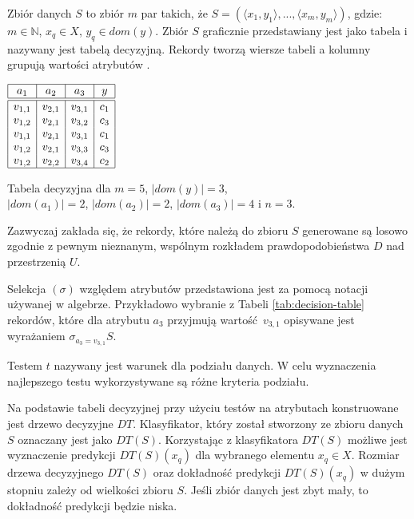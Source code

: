 \documentclass[12pt]{article}
\begin{document}
Zbiór danych $S$ to zbiór $m$ par takich, że $S = (\langle x_1, y_1\rangle, ..., \langle x_m, y_m\rangle)$,
gdzie: $m \in \mathbb{N} $, $x_q \in X$, $y_q \in dom(y)$. Zbiór $S$ graficznie przedstawiany jest jako tabela
i nazywany jest tabelą decyzyjną. Rekordy tworzą wiersze tabeli a kolumny grupują wartości atrybutów \cite{data-mining-with-decision-trees}.

\begin{table}[H]
    \centering
    $\begin{array}{|c|c|c|c|}
        \hline 
        a_1 & a_2 & a_3 & y \\
        \hline \hline
        v_{1,1} & v_{2,1} & v_{3,1} & c_1 \\
        v_{1,2} & v_{2,1} & v_{3,2} & c_3 \\
        v_{1,1} & v_{2,1} & v_{3,1} & c_1 \\
        v_{1,2} & v_{2,1} & v_{3,3} & c_3 \\
        v_{1,2} & v_{2,2} & v_{3,4} & c_2 \\
        \hline
    \end{array}$
    \caption{\label{tab:decision-table}Tabela decyzyjna dla $m=5$, $|dom(y)|=3$,\\ $|dom(a_1)|=2$, $|dom(a_2)|=2$, $|dom(a_3)|=4$ i $n=3$.}
\end{table}

Zazwyczaj zakłada się, że rekordy, które należą do
zbioru $S$ generowane są losowo zgodnie z pewnym nieznanym, wspólnym rozkładem prawdopodobieństwa $D$ nad przestrzenią $U$.

Selekcja $(\sigma)$ względem atrybutów przedstawiona jest za pomocą notacji używanej w algebrze.
Przykładowo wybranie z Tabeli \ref{tab:decision-table} rekordów, które dla atrybutu $a_3$ przyjmują
wartość~$v_{3,1}$ opisywane jest wyrażaniem $\sigma_{a_3=v_{3,1}}S$.

Testem $t$ nazywany jest warunek dla podziału danych. W celu wyznaczenia najlepszego testu wykorzystywane
są różne kryteria podziału.

Na podstawie tabeli decyzyjnej przy użyciu testów na atrybutach konstruowane jest drzewo decyzyjne $DT$.
Klasyfikator, który został stworzony ze zbioru danych $S$ oznaczany jest jako $DT(S)$. Korzystając z klasyfikatora
$DT(S)$ możliwe jest wyznaczenie predykcji $DT(S)(x_q)$ dla wybranego elementu $x_q \in X$. Rozmiar drzewa decyzyjnego $DT(S)$ oraz dokładność predykcji $DT(S)(x_q)$
w dużym stopniu zależy od wielkości zbioru $S$. Jeśli zbiór danych jest zbyt mały, to dokładność predykcji będzie niska.
\end{document}
